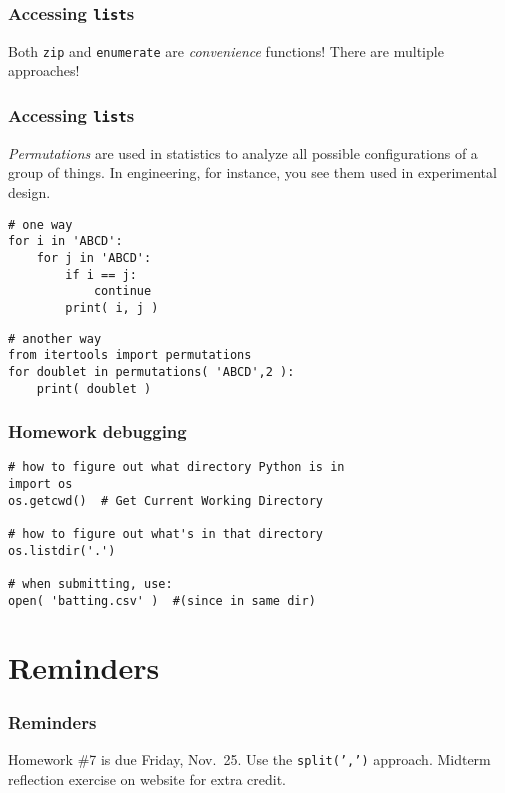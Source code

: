 \documentclass[11pt]{beamer}
\begin{document}
\begin{frame}[fragile]
  \frametitle{Accessing \texttt{list}s}
  \Enlarge

  \begin{enumerate}
  \myitem  Both \texttt{zip} and \texttt{enumerate} are \emph{convenience} functions!
  \myitem  There are multiple approaches!
  \end{enumerate}
\end{frame}

\begin{frame}[fragile]
  \frametitle{Accessing \texttt{list}s}

  \begin{enumerate}
  \myitem  \emph{Permutations} are used in statistics to analyze all possible configurations of a group of things.
  \myitem  In engineering, for instance, you see them used in experimental design.
  \end{enumerate}
  \begin{Verbatim}
# one way
for i in 'ABCD':
    for j in 'ABCD':
        if i == j:
            continue
        print( i, j )
  \end{Verbatim}
  \pause
  \begin{Verbatim}
# another way
from itertools import permutations
for doublet in permutations( 'ABCD',2 ):
    print( doublet )
  \end{Verbatim}
\end{frame}

\begin{frame}[fragile]
  \frametitle{Homework debugging}
  \Enlarge

  \begin{Verbatim}
# how to figure out what directory Python is in
import os
os.getcwd()  # Get Current Working Directory

# how to figure out what's in that directory
os.listdir('.')

# when submitting, use:
open( 'batting.csv' )  #(since in same dir)
  \end{Verbatim}
\end{frame}

\section{Reminders}

\begin{frame}
  \frametitle{Reminders}
  \Enlarge

  \begin{itemize}
  \myitem  Homework \#7 is due Friday, Nov.\ 25.
  \mysubitem  Use the \texttt{split(',')} approach.
  \myitem  Midterm reflection exercise on website for extra credit.
  \end{itemize}
\end{frame}
\end{document}
